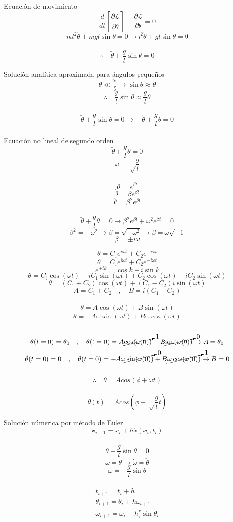 \documentclass[10pt,a4papper]{article}
\begin{document}
\newpage
Ecuación de movimiento
\[\frac{d}{dt}\left[\frac{\partial\mathcal{L}}{\partial\dot\theta}\right]-\frac{\partial\mathcal{L}}{\partial\theta}=0\]
\[ml^2\ddot\theta+mgl\sin\theta=0\to l^2\ddot\theta+gl\sin\theta=0\]\\
\[\boxed{\therefore\quad\ddot\theta+\frac{g}{l}\sin\theta=0}\]

\newpage
Solución analítica aproximada para ángulos pequeños
\[\theta\ll\frac{\pi}{2}\to\sin\theta\approx\theta\]
\[\therefore\quad\frac{g}{l}\sin\theta\approx\frac{g}{l}\theta\]\\
\[\ddot\theta+\frac{g}{l}\sin\theta=0\to\quad\ddot\theta+\frac{g}{l}\theta=0\]\\
Ecuación no lineal de segundo orden
\[\ddot\theta+\frac{g}{l}\theta=0\]
\[\omega=\sqrt\frac{g}{l}\]\\
\[\theta=e^{\beta t}\]
\[\dot\theta=\beta e^{\beta t}\]
\[\ddot\theta=\beta^2e^{\beta t}\]\\
\[\ddot\theta+\frac{g}{l}\theta=0\to\beta^2e^{\beta t}+\omega^2e^{\beta t}=0\]
\[\beta^2=-\omega^2\to\beta=\sqrt{-\omega^2}\to\beta=\omega\sqrt{-1}\]
\[\beta=\pm i\omega\]

\newpage
\[\theta=C_1e^{i\omega t}+C_2e^{-i\omega t}\]
\[\theta=C_1e^{i\omega t}+C_2e^{-i\omega t}\]
\[e^{\pm ik}=\cos k\pm i\sin k\]
\[\theta=C_1\cos(\omega t)+iC_1\sin(\omega t)+C_2\cos(\omega t)-iC_2\sin(\omega t)\]
\[\theta=(C_1+C_2)\cos(\omega t)+(C_1-C_2)i\sin(\omega t)\]
\[A=C_1+C_2\quad,\quad B=i(C_1-C_2)\]\\
\[\theta=A\cos(\omega t)+B\sin(\omega t)\]
\[\dot\theta=-A\omega\sin(\omega t)+B\omega\cos(\omega t)\]\\
\[\theta(t=0)=\theta_0\quad,\quad\theta(t=0)=A\cancelto{1}{\cos(\omega(0))}+B\cancelto{0}{\sin(\omega(0))}\to A=\theta_0\]
\[\dot\theta(t=0)=0\quad,\quad\dot\theta(t=0)=-A\cancelto{0}{\omega\sin(\omega(0))}+B\cancelto{1}{\omega\cos(\omega(0))}\to B=0\]\\
\[\therefore\quad\theta=Acos(\phi+\omega t)\]\\
\[\boxed{\theta(t)=Acos\left(\phi+\sqrt\frac{g}{l}t\right)}\]

\newpage
Solución númerica por método de Euler
\[x_{i+1}=x_i+h\dot x(x_i,t_i)\]\\
\[\ddot\theta+\frac{g}{l}\sin\theta=0\]
\[\omega=\dot\theta\to\dot\omega=\ddot\theta\]
\[\dot\omega=-\frac{g}{l}\sin\theta\]\\
\[\boxed{
  \begin{array}{rcl}
    t_{i+1}=t_i+h\\
    \theta_{i+1}=\theta_i+h\omega_{i+1}\\
    \omega_{i+1}=\omega_i-h\frac{g}{l}\sin\theta_i
  \end{array}
}
\]\\
\end{document}
